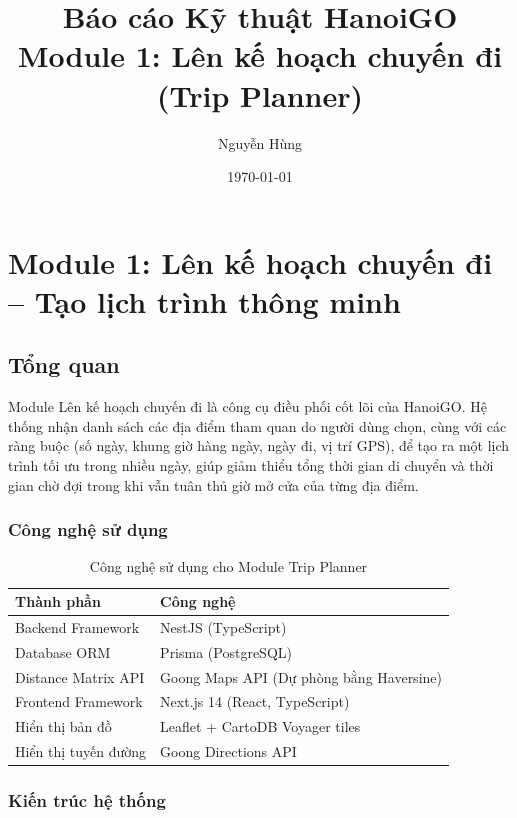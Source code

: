 \documentclass[12pt,a4paper]{report}
\begin{document}
\title{Báo cáo Kỹ thuật HanoiGO \\ \large Module 1: Lên kế hoạch chuyến đi (Trip Planner)}
\author{Nguyễn Hùng}
\date{\today}
\maketitle

\chapter{Module 1: Lên kế hoạch chuyến đi -- Tạo lịch trình thông minh}
\label{chap:trip-planner}

\section{Tổng quan}

Module Lên kế hoạch chuyến đi là công cụ điều phối cốt lõi của HanoiGO. Hệ thống nhận danh sách các địa điểm tham quan do người dùng chọn, cùng với các ràng buộc (số ngày, khung giờ hàng ngày, ngày đi, vị trí GPS), để tạo ra một lịch trình tối ưu trong nhiều ngày, giúp giảm thiểu tổng thời gian di chuyển và thời gian chờ đợi trong khi vẫn tuân thủ giờ mở cửa của từng địa điểm.

\subsection{Công nghệ sử dụng}

\begin{table}[H]
\centering
\begin{tabular}{|l|l|}
\hline
\textbf{Thành phần} & \textbf{Công nghệ} \\
\hline
Backend Framework & NestJS (TypeScript) \\
Database ORM & Prisma (PostgreSQL) \\
Distance Matrix API & Goong Maps API (Dự phòng bằng Haversine) \\
Frontend Framework & Next.js 14 (React, TypeScript) \\
Hiển thị bản đồ & Leaflet + CartoDB Voyager tiles \\
Hiển thị tuyến đường & Goong Directions API \\
\hline
\end{tabular}
\caption{Công nghệ sử dụng cho Module Trip Planner}
\end{table}

\subsection{Kiến trúc hệ thống}
\end{document}

